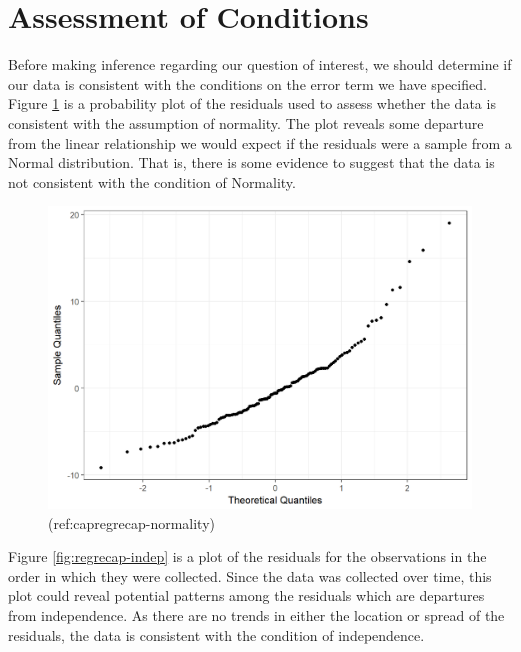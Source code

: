 \documentclass[]{book}
\theoremstyle{definition}
\theoremstyle{definition}
\theoremstyle{definition}
\theoremstyle{remark}
\begin{document}
\section{Assessment of Conditions}\label{assessment-of-conditions}

Before making inference regarding our question of interest, we should
determine if our data is consistent with the conditions on the error
term we have specified. Figure \ref{fig:regrecap-normality} is a
probability plot of the residuals used to assess whether the data is
consistent with the assumption of normality. The plot reveals some
departure from the linear relationship we would expect if the residuals
were a sample from a Normal distribution. That is, there is some
evidence to suggest that the data is not consistent with the condition
of Normality.





\begin{figure}

{\centering \includegraphics[width=0.8\linewidth]{./Images/regrecap-normality-1} 

}

\caption{(ref:capregrecap-normality)}\label{fig:regrecap-normality}
\end{figure}

Figure \ref{fig:regrecap-indep} is a plot of the residuals for the
observations in the order in which they were collected. Since the data
was collected over time, this plot could reveal potential patterns among
the residuals which are departures from independence. As there are no
trends in either the location or spread of the residuals, the data is
consistent with the condition of independence.
\end{document}
